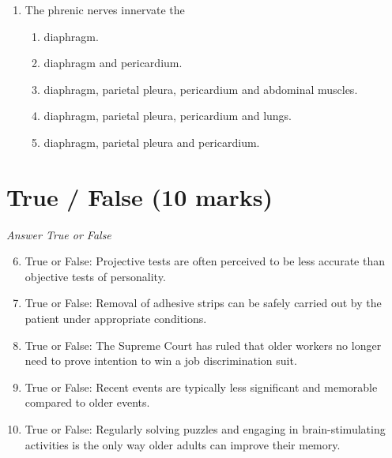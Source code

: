 \documentclass[12pt]{article}
\begin{document}
\begin{enumerate}[label=\arabic*.]
\begin{enumerate}[label=(\alph*)]
    \item motor and autonomic neuronal processes.
    \item both autonomic and motor neuronal processes.
    \item both sensory and motor neuronal processes.
    \item sensory and autonomic neuronal processes.
    \item motor neuronal processes.
\end{enumerate}
\item The phrenic nerves innervate the
\begin{enumerate}[label=(\alph*)]
    \item diaphragm.
    \item diaphragm and pericardium.
    \item diaphragm, parietal pleura, pericardium and abdominal muscles.
    \item diaphragm, parietal pleura, pericardium and lungs.
    \item diaphragm, parietal pleura and pericardium.
\end{enumerate}
\end{enumerate}

\section*{True / False (10 marks)}
\textit{Answer True or False}
\begin{enumerate}[label=\arabic*.]
\setcounter{enumi}{5}
\item True or False: Projective tests are often perceived to be less accurate than objective tests of personality.
\item True or False: Removal of adhesive strips can be safely carried out by the patient under appropriate conditions.
\item True or False: The Supreme Court has ruled that older workers no longer need to prove intention to win a job discrimination suit.
\item True or False: Recent events are typically less significant and memorable compared to older events.
\item True or False: Regularly solving puzzles and engaging in brain-stimulating activities is the only way older adults can improve their memory.
\end{enumerate}
\end{document}
